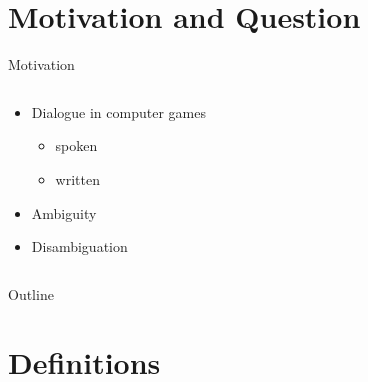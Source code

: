\documentclass[14pt]{beamer}
\institute{Universit\"at Hamburg\\\trinstitute}
\title{\trtitle}
\subtitle{\trtype}
\author{\trauthor}
\date{}
\theoremstyle{remark}
\begin{document}
\renewcommand{\arraystretch}{1.2}

\begin{frame}[plain] %
  \titlepage
\end{frame}


\section*{Motivation and Question}

\begin{frame}[t]{Motivation}
	\begin{columns}[t]
		\begin{column}{0.5\textwidth}	
			\begin{itemize}
	  			\item<2-> Dialogue in computer games
				\begin{itemize}
					\item<3-> spoken
					\item<4-> written
				\end{itemize}
				\item<5-> Ambiguity
				\item<5-> Disambiguation
			\end{itemize}
		\end{column}
		\begin{column}{68mm}\centering
			\begin{pgfpicture}{0cm}{3cm}{1cm}{0cm}
			\end{pgfpicture}
		\end{column}
		
	\end{columns}
\end{frame}

\begin{frame}{Outline}
	\tableofcontents
\end{frame}

\section{Definitions}
\end{document}
